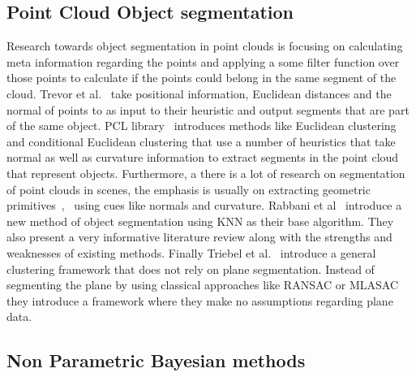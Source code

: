 \documentclass[twoside,hidelinks]{article}
\begin{document}
\subsection{Point Cloud Object segmentation}

Research towards object segmentation in point clouds is focusing on calculating meta information regarding the points and applying a some filter function over those points to calculate if the points could belong in the same segment of the cloud. Trevor et al.~\cite{pointSeg} take positional information, Euclidean distances and the normal of points to as input to their heuristic and output segments that are part of the same object. PCL library~\cite{pcl} introduces methods like Euclidean clustering and conditional Euclidean clustering that use a number of heuristics that take normal as well as curvature information to extract segments in the point cloud that represent objects. Furthermore, a there is a lot of research on segmentation of point clouds in scenes, the emphasis is usually on extracting geometric primitives~\cite{planarSeg},~\cite{planarSeg2} using cues like normals and curvature. Rabbani et al~\cite{segOverview} introduce a new method of object segmentation using KNN as their base algorithm. They also present a very informative literature review along with the strengths and weaknesses of existing methods. Finally Triebel et al.~\cite{smartSeg} introduce a general clustering framework that does not rely on plane segmentation. Instead of segmenting the plane by using classical approaches like RANSAC or MLASAC they introduce a framework where they make no assumptions regarding plane data. 

\subsection{Non Parametric Bayesian methods}
\end{document}
